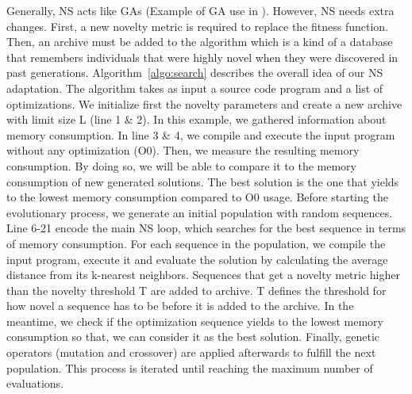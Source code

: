Generally, NS acts like GAs (Example of GA use in  \cite{cooper2002adaptive}). However, NS needs extra changes. First, a new novelty metric is required to replace the fitness function. Then, an archive must be added to the algorithm which is a kind of a database that remembers individuals that were highly novel when they were discovered in past generations. 
Algorithm~\ref{algo:search} describes the overall idea of our NS adaptation. The algorithm takes as input a source code program and a list of optimizations. We initialize first the novelty parameters and create a new archive with limit size L (line 1 \& 2). In this example, we gathered information about memory consumption. In line 3 \& 4, we compile and execute the input program without any optimization (O0). Then, we measure the resulting memory consumption. By doing so, we will be able to compare it to the memory consumption of new generated solutions. The best solution is the one that yields to the lowest memory consumption compared to O0 usage.
Before starting the evolutionary process, we generate an initial population with random sequences. Line 6-21 encode the main NS loop, which searches for the best sequence in terms of memory consumption. For each sequence in the population, we compile the input program, execute it and evaluate the solution by calculating the average distance from its k-nearest neighbors. Sequences that get a novelty metric higher than the novelty threshold T are added to archive. T defines the threshold for how novel a sequence has to be before it is added to the archive. In the meantime, we check if the optimization sequence yields to the lowest memory consumption so that, we can consider it as the best solution. Finally, genetic operators
(mutation and crossover) are applied afterwards to fulfill the next population. This process is iterated until reaching the maximum number of evaluations.


